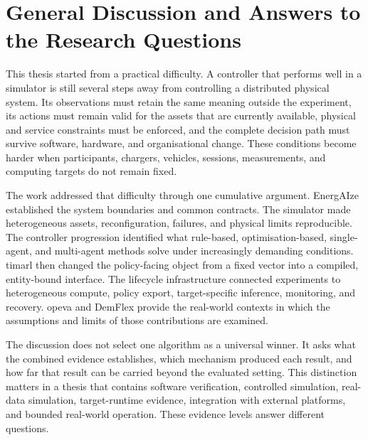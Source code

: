 \chapter{General Discussion and Answers to the Research Questions}
\label{chap:discussion}

This thesis started from a practical difficulty. A controller that performs well in a simulator is still several steps away from controlling a distributed physical system. Its observations must retain the same meaning outside the experiment, its actions must remain valid for the assets that are currently available, physical and service constraints must be enforced, and the complete decision path must survive software, hardware, and organisational change. These conditions become harder when participants, chargers, vehicles, sessions, measurements, and computing targets do not remain fixed.

The work addressed that difficulty through one cumulative argument. EnergAIze established the system boundaries and common contracts. The simulator made heterogeneous assets, reconfiguration, failures, and physical limits reproducible. The controller progression identified what rule-based, optimisation-based, single-agent, and multi-agent methods solve under increasingly demanding conditions. \gls{timarl} then changed the policy-facing object from a fixed vector into a compiled, entity-bound interface. The lifecycle infrastructure connected experiments to heterogeneous compute, policy export, target-specific inference, monitoring, and recovery. \gls{opeva} and DemFlex provide the real-world contexts in which the assumptions and limits of those contributions are examined.

The discussion does not select one algorithm as a universal winner. It asks what the combined evidence establishes, which mechanism produced each result, and how far that result can be carried beyond the evaluated setting. This distinction matters in a thesis that contains software verification, controlled simulation, real-data simulation, target-runtime evidence, integration with external platforms, and bounded real-world operation. These evidence levels answer different questions.



